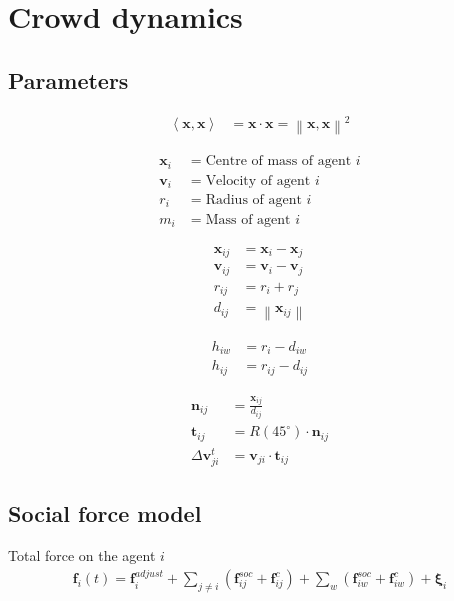 \section{Crowd dynamics}
\subsection{Parameters}

\begin{align}
\left\langle \mathbf{x}, \mathbf{x} \right\rangle &= \mathbf{x} \cdot \mathbf{x} = \left\| \mathbf{x}, \mathbf{x} \right\|^{2}
\end{align}

\begin{align}
\mathbf{x}_{i} &= \text{Centre of mass of agent } i \\
\mathbf{v}_{i} &= \text{Velocity of agent } i \\
r_{i} &= \text{Radius of agent } i \\
m_{i} &= \text{Mass of agent } i
\end{align}

\begin{align}
\mathbf{x}_{ij} &= \mathbf{x}_{i} - \mathbf{x}_{j} \\
\mathbf{v}_{ij} &= \mathbf{v}_{i} - \mathbf{v}_{j} \\
r_{ij} &= r_{i} + r_{j} \\
d_{ij} &= \left\|\mathbf{x}_{ij}\right\|
\end{align}

\begin{align}
h_{iw} &= r_{i} - d_{iw} \\
h_{ij} &= r_{ij} - d_{ij}
\end{align}

\begin{align}
\mathbf{n}_{ij} &= \frac{\mathbf{x}_{ij}}{d_{ij}} \\
\mathbf{t}_{ij} &= R(45^{\circ}) \cdot \mathbf{n}_{ij} \\
\Delta \mathbf{v}_{ji}^{t} &= \mathbf{v}_{ji} \cdot \mathbf{t}_{ij}
\end{align}

\subsection{Social force model}
Total force on the agent $ i $
\begin{align}
\mathbf{f}_{i}(t) = \mathbf{f}_{i}^{adjust} + \sum_{j\neq i}^{} \left(\mathbf{f}_{ij}^{soc} + \mathbf{f}_{ij}^{c}\right) + \sum_{w}^{} \left(\mathbf{f}_{iw}^{soc} + \mathbf{f}_{iw}^{c}\right) + \boldsymbol{\xi}_{i}
\end{align}

